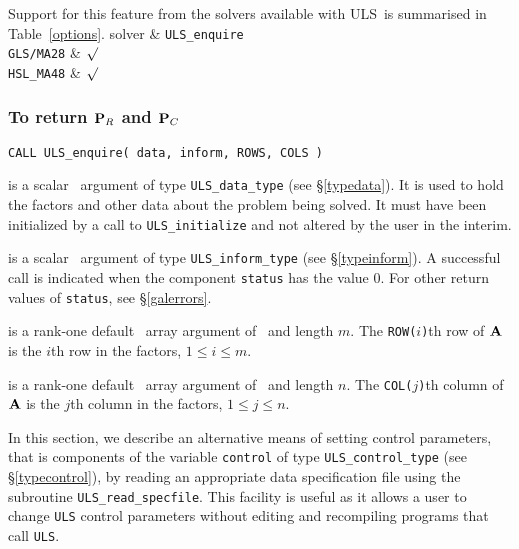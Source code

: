 \documentclass{galahad}
\newcommand{\packagename}{ULS}
\begin{document}
\newpage
Support for this feature from the solvers available with \packagename\
is summarised in Table~\ref{options}.
\hline
 solver & {\tt \packagename\_enquire} \\
\hline
{\tt GLS/MA28}  & $\surd$  \\
{\tt HSL\_MA48} & $\surd$  \\
\hline
{}
\vspace*{-8mm}
\subsubsection{To return ${\mathbf{P}}_R$ and ${\mathbf{P}}_C$}
\label{galenquire}

\hskip0.5in
{\tt CALL \packagename\_enquire( data, inform, ROWS, COLS )}

\begin{description}

 is a scalar \intentinout\ argument of type
{\tt \packagename\_data\_type}
(see \S\ref{typedata}). It is used to hold the factors and other
data about the problem being solved.
It must have been initialized by a call to
{\tt \packagename\_ini\-tialize} and not altered by the user in the interim.

 is a scalar \intentinout\ argument of type
{\tt \packagename\_inform\_type}
(see \S\ref{typeinform}).
A successful call is indicated when the  component {\tt status} has the value 0.
For other return values of {\tt status}, see \S\ref{galerrors}.

 is a rank-one default \integer\ array argument
of \intentout\  and length $m$. The {\tt ROW($i$)}th row of ${\mathbf{A}}$
is the $i$th row in the factors, $1 \leq i \leq m$.

 is a rank-one default \integer\ array argument
of \intentout\  and length $n$. The {\tt COL($j$)}th column of ${\mathbf{A}}$
is the $j$th column in the factors, $1 \leq j \leq n$.
\end{description}


\galcontrolfeatures
\noindent In this section, we describe an alternative means of setting
control parameters, that is components of the variable {\tt control} of type
{\tt \packagename\_control\_type}
(see \S\ref{typecontrol}),
by reading an appropriate data specification file using the
subroutine {\tt \packagename\_read\_specfile}. This facility
is useful as it allows a user to change  {\tt \packagename} control parameters
without editing and recompiling programs that call {\tt \packagename}.
\end{document}
